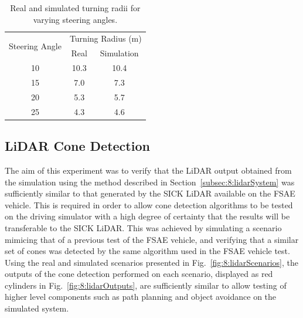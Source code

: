 \begin{table}[!ht]
	\centering
	\caption{Real and simulated turning radii for varying steering angles.}
	\label{tbl:8:steeringAngleVsTurningRadius}
	\begin{tabular}{ccc}
		\toprule
		\multirow{2}{*}{Steering Angle} & \multicolumn{2}{l}{Turning Radius (m)} \\ \cmidrule{2-3}
		                                & Real &                      Simulation \\ \midrule
		10                              & 10.3 &                            10.4 \\
		15                              &  7.0 &                             7.3 \\
		20                              &  5.3 &                             5.7 \\
		25                              &  4.3 &                             4.6 \\ \bottomrule
	\end{tabular}
\end{table}

\subsection{LiDAR Cone Detection} \label{subsec:8:lidarConeDetection}
The aim of this experiment was to verify that the LiDAR output obtained from the simulation using the method described in Section~\ref{subsec:8:lidarSystem} was sufficiently similar to that generated by the SICK LiDAR available on the FSAE vehicle.
This is required in order to allow cone detection algorithms to be tested on the driving simulator with a high degree of certainty that the results will be transferable to the SICK LiDAR.
This was achieved by simulating a scenario mimicing that of a previous test of the FSAE vehicle, and verifying that a similar set of cones was detected by the same algorithm used in the FSAE vehicle test.
Using the real and simulated scenarios presented in Fig.~\ref{fig:8:lidarScenarios}, the outputs of the cone detection performed on each scenario, displayed as red cylinders in Fig.~\ref{fig:8:lidarOutputs}, are sufficiently similar to allow testing of higher level components such as path planning and object avoidance on the simulated system.

